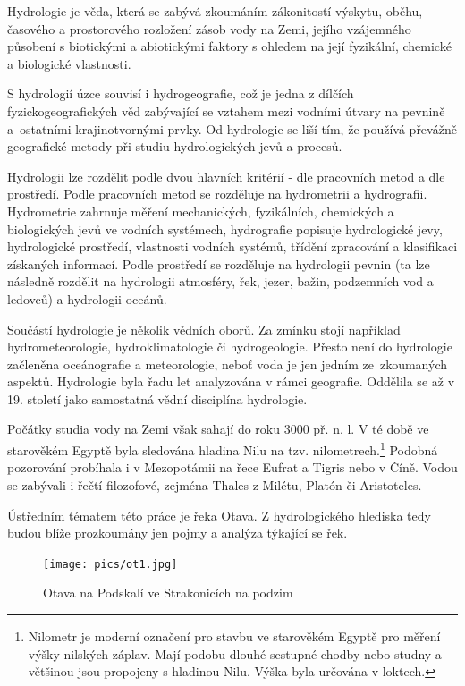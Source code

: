 \documentclass[thesis=M,czech]{FITthesis}[2012/06/26]
\begin{document}
Hydrologie je věda, která se zabývá zkoumáním zákonitostí výskytu, oběhu, časového a prostorového rozložení zásob vody na Zemi, jejího vzájemného působení s biotickými a abiotickými faktory s ohledem na její fyzikální, chemické a biologické vlastnosti. 


S hydrologií úzce souvisí i hydrogeografie, což je jedna z dílčích fyzickogeografických věd zabývající se vztahem mezi vodními útvary na pevnině a~ostatními krajinotvornými prvky. Od hydrologie se liší tím, že používá převážně geografické metody při studiu hydrologických jevů a procesů. 


Hydrologii lze rozdělit podle dvou hlavních kritérií - dle pracovních metod a dle prostředí. Podle pracovních metod se rozděluje na hydrometrii a hydrografii. Hydrometrie zahrnuje měření mechanických, fyzikálních, chemických a biologických jevů ve vodních systémech, hydrografie popisuje hydrologické jevy, hydrologické prostředí, vlastnosti vodních systémů, třídění zpracování a klasifikaci získaných informací. Podle prostředí se rozděluje na hydrologii pevnin (ta lze následně rozdělit na hydrologii atmosféry, řek, jezer, bažin, podzemních vod a ledovců) a hydrologii oceánů. 

Součástí hydrologie je několik vědních oborů. Za zmínku stojí například hydrometeorologie, hydroklimatologie či hydrogeologie. Přesto není do hydrologie začleněna oceánografie a meteorologie, neboť voda je jen jedním ze~zkoumaných aspektů. Hydrologie byla řadu let analyzována v rámci geografie. Oddělila se až v 19. století jako samostatná vědní disciplína hydrologie. 

Počátky studia vody na Zemi však sahají do roku 3000 př. n. l. V té době ve starověkém Egyptě byla sledována hladina Nilu na tzv. nilometrech.\footnote{Nilometr je moderní označení pro stavbu ve starověkém Egyptě pro měření výšky nilských záplav. Mají podobu dlouhé sestupné chodby nebo studny a většinou jsou propojeny s hladinou Nilu. Výška byla určována v loktech.} Podobná pozorování probíhala i v Mezopotámii na řece Eufrat a Tigris nebo v Číně. Vodou se zabývali i řečtí filozofové, zejména Thales z Milétu, Platón či Aristoteles. 


Ústředním tématem této práce je řeka Otava. Z hydrologického hlediska tedy budou blíže prozkoumány jen pojmy a analýza týkající se řek. \cite{definiceHydro} \cite{FGkniha} \cite{hydro_net}


\begin{figure}[h!]
	\centering
	\texttt{[image: pics/ot1.jpg]}
	\caption{Otava na Podskalí ve Strakonicích na podzim}
	\label{obrazek:ot1}
\end{figure}
\end{document}
